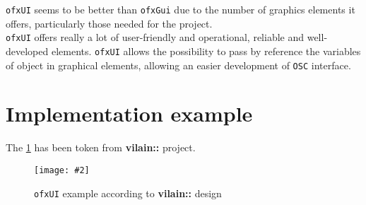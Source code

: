 \documentclass[a4paper,titlepage,oneside]{article}
\newcommand{\image}[5][\textwidth]{%
    \begin{figure}[h]
        \centering
            \begin{minipage}[c]{#1}
                \centering
                \texttt{[image: \#2]}
                \caption{#4}
                \label{#5}
            \end{minipage}
    \end{figure}
}
\newcommand{\vilain}{\textbf{vilain::}}
\begin{document}
\texttt{ofxUI} seems to be better than \texttt{ofxGui} due to the number of graphics elements it offers, particularly those needed for the project.\\\texttt{ofxUI} offers really a lot of user-friendly and operational, reliable and well-developed elements.
\texttt{ofxUI} allows the possibility to pass by reference the variables of object in graphical elements, allowing an easier development of \texttt{OSC} interface.

\newpage
\section{Implementation example}
The \figurename \ref{fig:GUIVilainExample} has been token from \vilain{} project.  \image{data/GUIVilain.jpg}{width=12cm}{\texttt{ofxUI} example according to \vilain{} design}{fig:GUIVilainExample}

\newpage
\printbibheading
\printbibliography[nottype=online,check=notonline,heading=subbibliography,title={Bibliography}]
\printbibliography[check=online,heading=subbibliography,title={Webography}]
\nocite{*}
\end{document}
